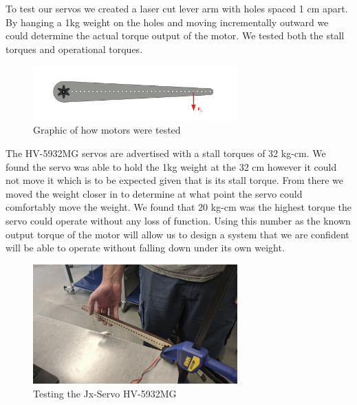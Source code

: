                 To test our servos we created a laser cut lever arm with holes spaced 1 cm apart. By hanging a 1kg weight on the holes and moving incrementally outward we could determine the actual torque output of the motor. We tested both the stall torques and operational torques.

                \begin{figure}[H]
                    \centering
                    \includegraphics[width=0.7\textwidth]{figures/MotorTestingDiagram.png}
                    \caption{Graphic of how motors were tested}
                    \label{fig:MotorTestingGraphic}
                \end{figure}

                The HV-5932MG servos are advertised with a stall torques of 32 kg-cm. We found the servo was able to hold the 1kg weight at the 32 cm however it could not move it which is to be expected given that is its stall torque. From there we moved the weight closer in to determine at what point the servo could comfortably move the weight. We found that 20 kg-cm was the highest torque the servo could operate without any loss of function. Using this number as the known output torque of the motor will allow us to design a system that we are confident will be able to operate without falling down under its own weight.

                \begin{figure}[H]
                    \centering
                    \includegraphics[width=0.7\textwidth]{figures/TestingMotors.png}
                    \caption{Testing the Jx-Servo HV-5932MG}
                    \label{fig:MotorTesting}
                \end{figure}
    

